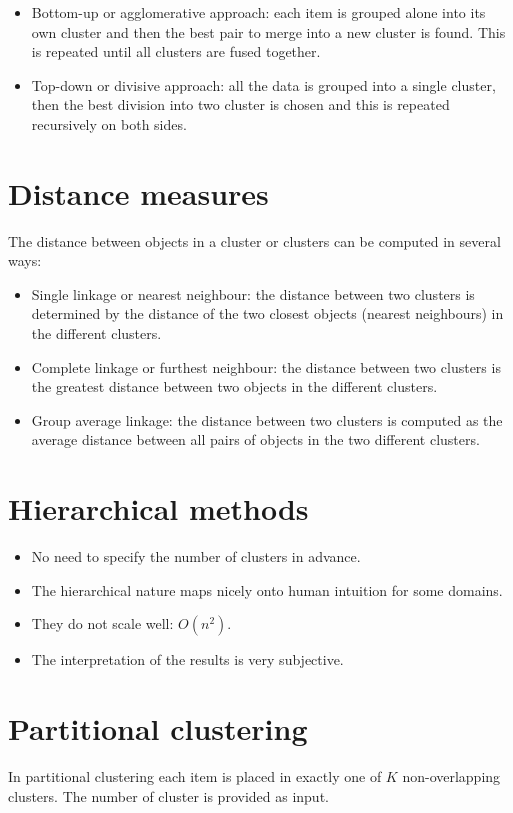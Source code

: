 \begin{itemize}
	\item Bottom-up or agglomerative approach: each item is grouped alone into its own cluster and then the best pair to merge into a new cluster is found.
		This is repeated until all clusters are fused together.
	\item Top-down or divisive approach: all the data is grouped into a single cluster, then the best division into two cluster is chosen and this is repeated recursively on both sides.
\end{itemize}

\section{Distance measures}
The distance between objects in a cluster or clusters can be computed in several ways:

\begin{itemize}
	\item Single linkage or nearest neighbour: the distance between two clusters is determined by the distance of the two closest objects (nearest neighbours) in the different clusters.
	\item Complete linkage or furthest neighbour: the distance between two clusters is the greatest distance between two objects in the different clusters.
	\item Group average linkage: the distance between two clusters is computed as the average distance between all pairs of objects in the two different clusters.
\end{itemize}

\section{Hierarchical methods}

\begin{itemize}
	\item No need to specify the number of clusters in advance.
	\item The hierarchical nature maps nicely onto human intuition for some domains.
	\item They do not scale well: $O(n^2)$.
	\item The interpretation of the results is very subjective.
\end{itemize}

\section{Partitional clustering}
In partitional clustering each item is placed in exactly one of $K$ non-overlapping clusters.
The number of cluster is provided as input.

